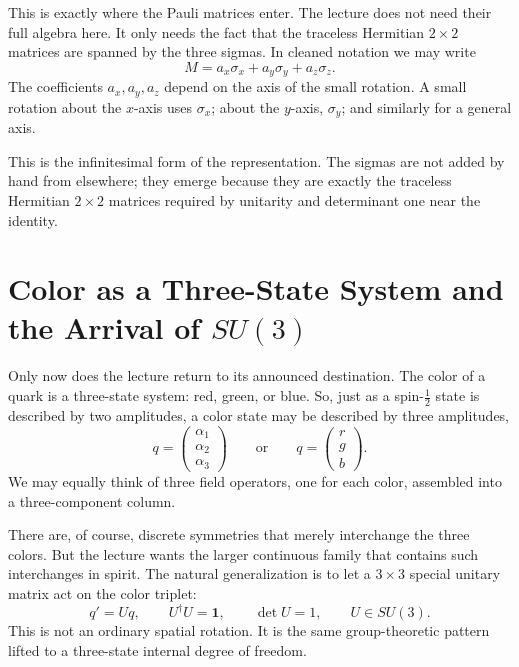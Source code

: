 This is exactly where the Pauli matrices enter. The lecture does not need their full algebra here. It only needs the fact that the traceless Hermitian \(2\times 2\) matrices are spanned by the three sigmas. In cleaned notation we may write
\begin{equation}
M=a_x\sigma_x+a_y\sigma_y+a_z\sigma_z.
\end{equation}
The coefficients \(a_x,a_y,a_z\) depend on the axis of the small rotation. A small rotation about the \(x\)-axis uses \(\sigma_x\); about the \(y\)-axis, \(\sigma_y\); and similarly for a general axis.

This is the infinitesimal form of the representation. The sigmas are not added by hand from elsewhere; they emerge because they are exactly the traceless Hermitian \(2\times 2\) matrices required by unitarity and determinant one near the identity.

\section{Color as a Three-State System and the Arrival of \texorpdfstring{\(SU(3)\)}{SU(3)}}

Only now does the lecture return to its announced destination. The color of a quark is a three-state system: red, green, or blue. So, just as a spin-\(\frac12\) state is described by two amplitudes, a color state may be described by three amplitudes,
\begin{equation}
q=
\begin{pmatrix}
\alpha_1\\
\alpha_2\\
\alpha_3
\end{pmatrix}
\qquad\text{or}\qquad
q=
\begin{pmatrix}
r\\
g\\
b
\end{pmatrix}.
\end{equation}
We may equally think of three field operators, one for each color, assembled into a three-component column.

There are, of course, discrete symmetries that merely interchange the three colors. But the lecture wants the larger continuous family that contains such interchanges in spirit. The natural generalization is to let a \(3\times 3\) special unitary matrix act on the color triplet:
\begin{equation}
q' = Uq,
\qquad
U^\dagger U=\mathbf 1,
\qquad
\det U=1,
\qquad
U\in SU(3).
\end{equation}
This is not an ordinary spatial rotation. It is the same group-theoretic pattern lifted to a three-state internal degree of freedom.


